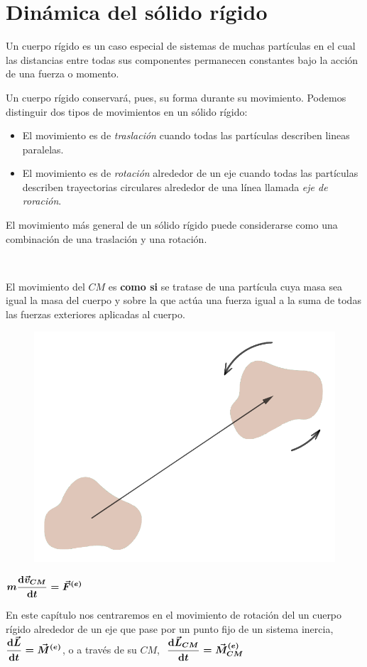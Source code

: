 \chapter{Dinámica del sólido rígido}

\begin{miparrafo}
	Un cuerpo rígido es un caso especial de sistemas de muchas partículas en el cual las distancias entre todas sus componentes permanecen constantes bajo la acción de una fuerza o momento.
	
	Un cuerpo rígido conservará, pues, su forma durante su movimiento. Podemos distinguir dos tipos de movimientos en un sólido rígido:
	
	\begin{itemize}
		\item El movimiento es de \emph{traslación} cuando todas las partículas describen lineas paralelas.
		\item El movimiento es de \emph{rotación} alrededor de un eje cuando todas las partículas describen trayectorias circulares alrededor de una línea llamada \emph{eje de roración}.	
	\end{itemize}
	
	El movimiento más general de un sólido rígido puede considerarse como una combinación de una traslación y una rotación.

\begin{multicols}{2}
$\quad$ 

El movimiento del $CM$ es \textbf{como si} se tratase de una partícula cuya masa sea igual la masa del cuerpo y sobre la que actúa una fuerza igual a la suma de todas las fuerzas exteriores aplicadas al cuerpo.
\begin{figure}[H]
	\centering
	\includegraphics[width=.3\textwidth]{imagenes/imagenes16/T16IM01.png}
\end{figure}
\end{multicols}

$\boldsymbol{ \displaystyle m\dv{\vec v_{CM}}{t}=\vec F^{(e)} }$

En este capítulo nos centraremos en el movimiento de rotación del un cuerpo rígido alrededor de un eje que pase por un punto fijo de un sistema inercia, 
$\displaystyle \boldsymbol{\dv{\vec L}{t}=\vec M^{(e)}}$, o a través de su $CM$, $\ \displaystyle \boldsymbol{\dv{\vec L_{CM}}{t}=\vec M_{CM}^{(e)}}$
\end{miparrafo}

